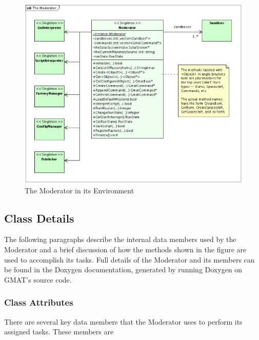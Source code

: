 \begin{figure}[htb]
\begin{center}
\includegraphics[scale=0.5]{Images/TheModerator.eps}
\caption{The Moderator in its Environment}
\label{figure:ModeratorClassDiagram}
\end{center}
\end{figure}

\subsection{Class Details}

The following paragraphs describe the internal data members used by
the Moderator and a brief discussion of how the methods shown in the figure are used to accomplish
its tasks.  Full details of the Moderator and its members can be found in the Doxygen
documentation, generated by running Doxygen\cite{doxygen} on GMAT's source code.

\subsubsection{Class Attributes}

There are several key data members that the Moderator uses to perform its assigned tasks.  These
members are

